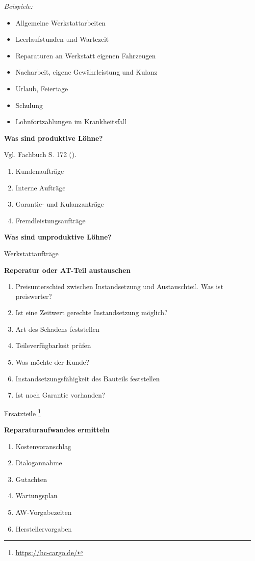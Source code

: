 \emph{Beispiele:}

\begin{itemize}
\item
  Allgemeine Werkstattarbeiten
\item
  Leerlaufstunden und Wartezeit
\item
  Reparaturen an Werkstatt eigenen Fahrzeugen
\item
  Nacharbeit, eigene Gewährleistung und Kulanz
\item
  Urlaub, Feiertage
\item
  Schulung
\item
  Lohnfortzahlungen im Krankheitsfall
\end{itemize}

\textbf{Was sind produktive Löhne?}

Vgl. Fachbuch S. 172 (\textcite{heiser:2017:betriebsfuhrung}).

\begin{enumerate}
\item
  Kundenaufträge
\item
  Interne Aufträge
\item
  Garantie- und Kulanzanträge
\item
  Fremdleistungsaufträge
\end{enumerate}

\textbf{Was sind unproduktive Löhne?}

Werkstattaufträge

\textbf{Reperatur oder AT-Teil austauschen}

\begin{enumerate}
\item
  Preisunterschied zwischen Instandsetzung und Austauschteil. Was ist
  preiswerter?
\item
  Ist eine Zeitwert gerechte Instandsetzung möglich?
\item
  Art des Schadens feststellen
\item
  Teileverfügbarkeit prüfen
\item
  Was möchte der Kunde?
\item
  Instandsetzungsfähigkeit des Bauteils feststellen
\item
  Ist noch Garantie vorhanden?
\end{enumerate}

Ersatzteile \footnote{\url{https://hc-cargo.de/}}

\textbf{Reparaturaufwandes ermitteln}

\begin{enumerate}
\item
  Kostenvoranschlag
\item
  Dialogannahme
\item
  Gutachten
\item
  Wartungsplan
\item
  AW-Vorgabezeiten
\item
  Herstellervorgaben
\end{enumerate}

